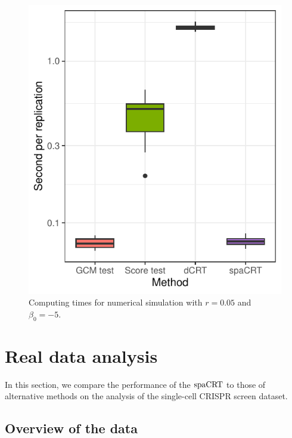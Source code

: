 \documentclass[12pt]{article}
\theoremstyle{definition}
\newcommand{\spacrt}{\textnormal{spaCRT}}               %
\begin{document}
\begin{figure}[h!]
	\centering
	\includegraphics{figures-and-tables/simulation-computing-times.pdf}
	\caption{Computing times for numerical simulation with $r = 0.05$ and $\beta_0 = -5$.}
	\label{fig:simulation-computing-times}
\end{figure}


\section{Real data analysis} \label{sec:real_data}

In this section, we compare the performance of the $\spacrt$ to those of alternative methods on the analysis of the \citet{Gasperini2019a} single-cell CRISPR screen dataset. 

\subsection{Overview of the data}
\end{document}
